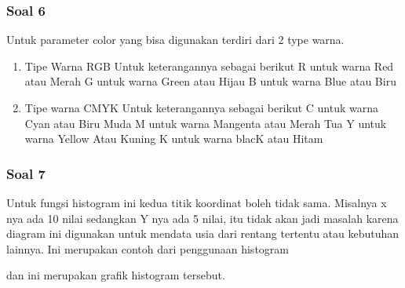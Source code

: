 \subsubsection{Soal 6}
\hfill \break
Untuk parameter color yang bisa digunakan terdiri dari 2 type warna.
\begin{enumerate}
    \item Tipe Warna RGB
    Untuk keterangannya sebagai berikut
    R untuk warna Red atau Merah
    G untuk warna Green atau Hijau
    B untuk warna Blue atau Biru
    \item Tipe warna CMYK
    Untuk keterangannya sebagai berikut
    C untuk warna Cyan atau Biru Muda
    M untuk warna Mangenta atau Merah Tua
    Y untuk warna Yellow Atau Kuning
    K untuk warna blacK atau Hitam
\end{enumerate}
\subsubsection{Soal 7}
\hfill \break
Untuk fungsi histogram ini kedua titik koordinat boleh tidak sama. Misalnya x nya ada 10 nilai sedangkan Y nya ada 5 nilai, itu tidak akan jadi masalah karena diagram ini digunakan untuk mendata usia dari rentang tertentu atau kebutuhan lainnya.
Ini merupakan contoh dari penggunaan histogram

dan ini merupakan grafik histogram tersebut.
